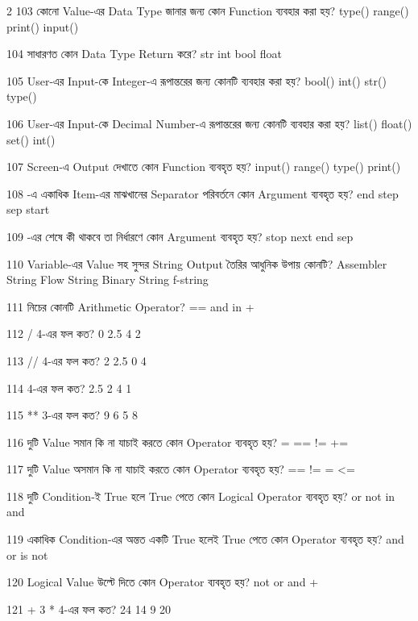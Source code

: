 \begin{multicols}{2}
\mcq
{103}
{কোনো Value-এর Data Type জানার জন্য কোন Function ব্যবহার করা হয়?}
{type()}
{range()}
{print()}
{input()}

\mcq
{104}
{ সাধারণত কোন Data Type Return করে?}
{str}
{int}
{bool}
{float}

\mcq
{105}
{User-এর Input-কে Integer-এ রূপান্তরের জন্য কোনটি ব্যবহার করা হয়?}
{bool()}
{int()}
{str()}
{type()}

\mcq
{106}
{User-এর Input-কে Decimal Number-এ রূপান্তরের জন্য কোনটি ব্যবহার করা হয়?}
{list()}
{float()}
{set()}
{int()}

\mcq
{107}
{Screen-এ Output দেখাতে কোন Function ব্যবহৃত হয়?}
{input()}
{range()}
{type()}
{print()}

\mcq
{108}
{-এ একাধিক Item-এর মাঝখানের Separator পরিবর্তনে কোন Argument ব্যবহৃত হয়?}
{end}
{step}
{sep}
{start}

\mcq
{109}
{-এর শেষে কী থাকবে তা নির্ধারণে কোন Argument ব্যবহৃত হয়?}
{stop}
{next}
{end}
{sep}

\mcq
{110}
{Variable-এর Value সহ সুন্দর String Output তৈরির আধুনিক উপায় কোনটি?}
{Assembler String}
{Flow String}
{Binary String}
{f-string}

\mcq
{111}
{নিচের কোনটি Arithmetic Operator?}
{==}
{and}
{in}
{+}

\mcqwide
{112}
{\textenglish{ / 4}-এর ফল কত?}
{0}
{2.5}
{4}
{2}

\mcqwide
{113}
{\textenglish{ // 4}-এর ফল কত?}
{2}
{2.5}
{0}
{4}

\mcqwide
{114}
{\textenglish{  4}-এর ফল কত?}
{2.5}
{2}
{4}
{1}

\mcqwide
{115}
{\textenglish{ ** 3}-এর ফল কত?}
{9}
{6}
{5}
{8}

\mcq
{116}
{দুটি Value সমান কি না যাচাই করতে কোন Operator ব্যবহৃত হয়?}
{=}
{==}
{!=}
{+=}

\mcq
{117}
{দুটি Value অসমান কি না যাচাই করতে কোন Operator ব্যবহৃত হয়?}
{==}
{!=}
{=}
{<=}

\mcq
{118}
{দুটি Condition-ই True হলে True পেতে কোন Logical Operator ব্যবহৃত হয়?}
{or}
{not}
{in}
{and}

\mcq
{119}
{একাধিক Condition-এর অন্তত একটি True হলেই True পেতে কোন Operator ব্যবহৃত হয়?}
{and}
{or}
{is}
{not}

\mcq
{120}
{Logical Value উল্টে দিতে কোন Operator ব্যবহৃত হয়?}
{not}
{or}
{and}
{+}

\mcqwide
{121}
{\textenglish{ + 3 * 4}-এর ফল কত?}
{24}
{14}
{9}
{20}


\end{multicols}

